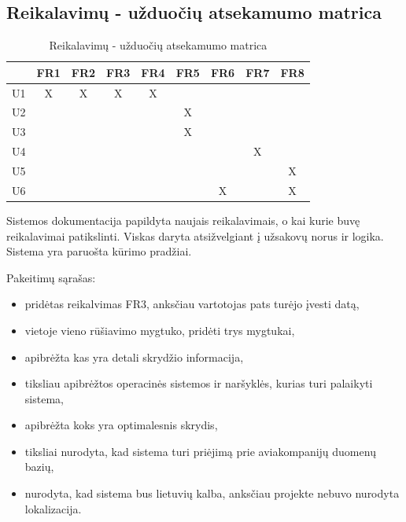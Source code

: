 \documentclass{VUMIFPSkursinis}
\begin{document}
\begin{enumerate}[label=\textbf{U\arabic*}.]
                \end{enumerate}
      
            \subsection{Reikalavimų - užduočių atsekamumo matrica}
            \begin{table}[H]\footnotesize
                \centering
                \caption{Reikalavimų - užduočių atsekamumo matrica}
                {
                    \begin{tabular}{|c|c|c|c|c|c|c|c|c| }
                    \hline
                        & FR1 & FR2 & FR3 & FR4 & FR5 & FR6 & FR7 & FR8 \\ 
                    \hline
                     U1 & X   & X   & X   & X   &     &     &     &      \\  
                    \hline
                     U2 &     &     &     &     & X   &     &     &      \\ 
                    \hline
                     U3 &     &     &     &     & X   &     &     &      \\ 
                    \hline
                     U4 &     &     &     &     &     &     & X   &      \\ 
                    \hline
                     U5 &     &     &     &     &     &     &     & X    \\ 
                    \hline
                     U6 &     &     &     &     &     & X   &     & X    \\ 
                    \hline 
                    \end{tabular}
                }
            \end{table}

			Sistemos dokumentacija papildyta naujais reikalavimais, o kai kurie buvę reikalavimai patikslinti. Viskas daryta atsižvelgiant į užsakovų norus ir logika. Sistema yra paruošta kūrimo pradžiai.
			
			Pakeitimų sąrašas:
			\begin{itemize}
				\item pridėtas reikalvimas FR3, anksčiau vartotojas pats turėjo įvesti datą,
				\item vietoje vieno rūšiavimo mygtuko, pridėti trys mygtukai,
				\item apibrėžta kas yra detali skrydžio informacija,
				\item tiksliau apibrėžtos operacinės sistemos ir naršyklės, kurias turi palaikyti sistema,
				\item apibrėžta koks yra optimalesnis skrydis,
				\item tiksliai nurodyta, kad sistema turi priėjimą prie aviakompanijų duomenų bazių,
				\item nurodyta, kad sistema bus lietuvių kalba, anksčiau projekte nebuvo nurodyta lokalizacija.
			\end{itemize}
    
\end{document}
